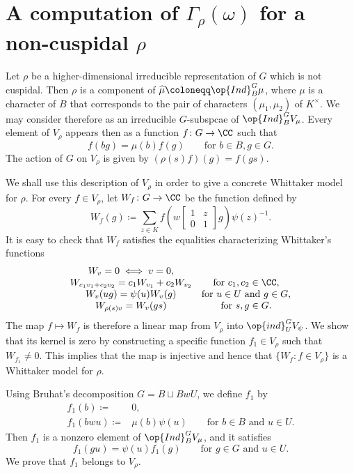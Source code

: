 \documentclass[../main.tex]{subfiles}
\begin{document}
\section{A computation of \texorpdfstring{$\Gamma_\rho(\omega)$}{ Gamma rho(omega)} for a non-cuspidal \texorpdfstring{$\rho$}{ rho}}
Let $\rho$ be a higher-dimensional irreducible representation of $G$ which is not cuspidal. Then $\rho$ is a component of $\widehat\mu\coloneqq\op{Ind}^G_B\mu$, where $\mu$ is a character of $B$ that corresponds to the pair of characters $(\mu_1,\mu_2)$ of $K^\times$. We may consider therefore as an irreducible $G$-subspcae of $\op{Ind}^G_BV_\mu$. Every element of $V_\rho$ appears then as a function $f\colon G\to\CC$ such that
\[f(bg)=\mu(b)f(g)\qquad\text{for }b\in B,g\in G.\]
The action of $G$ on $V_\rho$ is given by $(\rho(s)f)(g)=f(gs)$.

We shall use this description of $V_\rho$ in order to give a concrete Whittaker model for $\rho$. For every $f\in V_\rho$, let $W_f\colon G\to\CC$ be the function defined by
\begin{equation}
	W_f(g)\coloneqq\sum_{z\in K}f\left(w\begin{bmatrix}
		1 & z \\
		0 & 1
	\end{bmatrix}g\right)\psi(z)^{-1}. \label{eq:non-cusp-whittaker-model}
\end{equation}
It is easy to check that $W_f$ satisfies the equalities characterizing Whittaker's functions
\[\begin{array}{cc}
	W_v=0\iff v=0, \\
	W_{c_1v_1+c_2v_2}=c_1W_{v_1}+c_2W_{v_2} & \text{for }c_1,c_2\in\CC, \\
	W_v(ug)=\psi(u)W_v(g) & \text{for }u\in U\text{ and }g\in G, \\
	W_{\rho(s)v}=W_v(gs) & \text{for }s,g\in G.
\end{array}\]
The map $f\mapsto W_f$ is therefore a linear map from $V_\rho$ into $\op{ind}^G_UV_\psi$. We show that its kernel is zero by constructing a specific function $f_1\in V_\rho$ such that $W_{f_1}\ne0$. This implies that the map is injective and hence that $\{W_f:f\in V_\rho\}$ is a Whittaker model for $\rho$.

Using Bruhat's decomposition $G=B\sqcup BwU$, we define $f_1$ by
\begin{align}
	f_1(b) \coloneqq{}& 0, \label{eq:f1-on-b} \\
	f_1(bwu) \coloneqq{}& \mu(b)\psi(u)\qquad\text{for }b\in B\text{ and }u\in U. \label{eq:f1-on-bwu}
\end{align}
Then $f_1$ is a nonzero element of $\op{Ind}^G_BV_\mu$, and it satisfies
\begin{equation}
	f_1(gu) = \psi(u)f_1(g)\qquad\text{for }g\in G\text{ and }u\in U. \label{eq:f1-eigenvalue}
\end{equation}
We prove that $f_1$ belongs to $V_\rho$.
\end{document}
